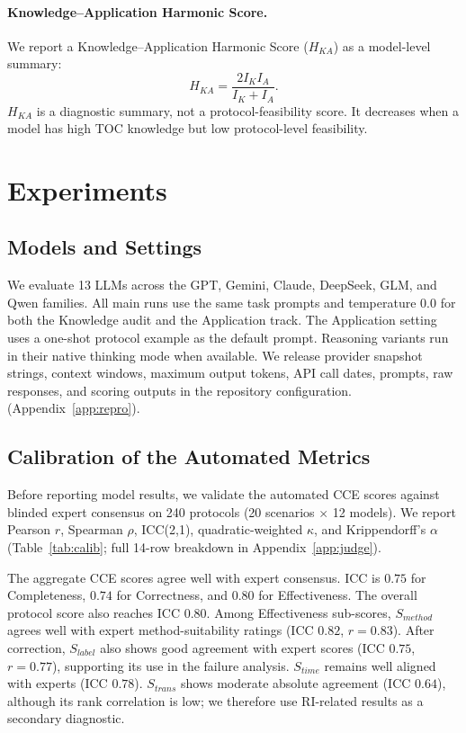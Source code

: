 \documentclass[conference]{IEEEtran}
\begin{document}
\paragraph{Knowledge--Application Harmonic Score.}
We report a Knowledge--Application Harmonic Score ($H_{KA}$) as a model-level
summary:
\begin{equation}
H_{KA} = \frac{2 I_K I_A}{I_K + I_A}.
\end{equation}
$H_{KA}$ is a diagnostic summary, not a protocol-feasibility score. It decreases
when a model has high TOC knowledge but low protocol-level feasibility.

\section{Experiments}
\subsection{Models and Settings}
We evaluate 13 LLMs across the GPT, Gemini, Claude, DeepSeek, GLM, and Qwen
families. All main runs use the same task prompts and temperature $0.0$ for both
the Knowledge audit and the Application track. The Application setting uses a
one-shot protocol example as the default prompt. Reasoning variants run in their
native thinking mode when available. We release provider snapshot strings,
context windows, maximum output tokens, API call dates, prompts, raw responses,
and scoring outputs in the repository configuration.
(Appendix~\ref{app:repro}).

\subsection{Calibration of the Automated Metrics}\label{sec:calib}

Before reporting model results, we validate the automated CCE scores against
blinded expert consensus on 240 protocols (20 scenarios $\times$ 12 models).
We report Pearson $r$, Spearman $\rho$, ICC(2,1), quadratic-weighted $\kappa$,
and Krippendorff's $\alpha$ (Table~\ref{tab:calib}; full 14-row breakdown in
Appendix~\ref{app:judge}).

The aggregate CCE scores agree well with expert consensus. ICC is $0.75$ for
Completeness, $0.74$ for Correctness, and $0.80$ for Effectiveness. The overall
protocol score also reaches ICC $0.80$. Among Effectiveness sub-scores,
$S_{method}$ agrees well with expert method-suitability ratings
(ICC $0.82$, $r=0.83$). After correction, $S_{label}$ also shows good agreement
with expert scores (ICC $0.75$, $r=0.77$), supporting its use in the failure
analysis. $S_{time}$ remains well aligned with experts (ICC $0.78$).
$S_{trans}$ shows moderate absolute agreement (ICC $0.64$), although its rank
correlation is low; we therefore use RI-related results as a secondary
diagnostic.
\end{document}
